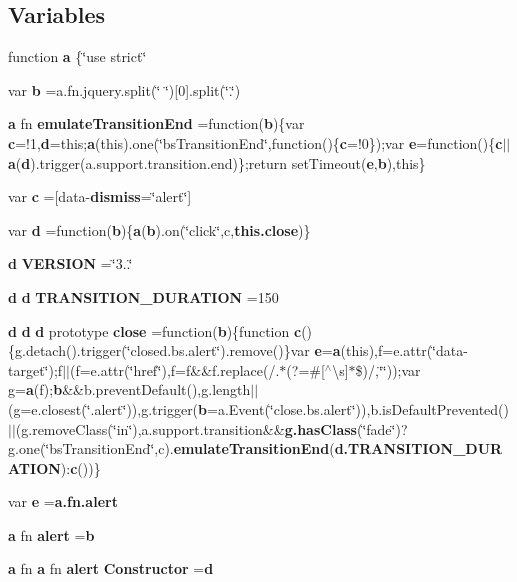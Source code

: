\subsection*{Variables}
\begin{DoxyCompactItemize}
\item 
function {\bf a} \{\char`\"{}use strict\char`\"{}
\item 
var {\bf b} =a.\+fn.\+jquery.\+split(\char`\"{} \char`\"{})[0].split(\char`\"{}.\char`\"{})
\item 
{\bf a} fn {\bf emulate\+Transition\+End} =function({\bf b})\{var {\bf c}=!1,{\bf d}=this;{\bf a}(this).one(\char`\"{}bs\+Transition\+End\char`\"{},function()\{{\bf c}=!0\});var {\bf e}=function()\{{\bf c}$\vert$$\vert${\bf a}({\bf d}).trigger(a.\+support.\+transition.\+end)\};return set\+Timeout({\bf e},{\bf b}),this\}
\item 
var {\bf c} =\textquotesingle{}[data-\/{\bf dismiss}=\char`\"{}alert\char`\"{}]\textquotesingle{}
\item 
var {\bf d} =function({\bf b})\{{\bf a}({\bf b}).on(\char`\"{}click\char`\"{},c,{\bf this.\+close})\}
\item 
{\bf d} {\bf V\+E\+R\+S\+I\+O\+N} =\char`\"{}3..\char`\"{}
\item 
{\bf d} {\bf d} {\bf T\+R\+A\+N\+S\+I\+T\+I\+O\+N\+\_\+\+D\+U\+R\+A\+T\+I\+O\+N} =150
\item 
{\bf d} {\bf d} {\bf d} prototype {\bf close} =function({\bf b})\{function {\bf c}()\{g.\+detach().trigger(\char`\"{}closed.\+bs.\+alert\char`\"{}).remove()\}var {\bf e}={\bf a}(this),f=e.\+attr(\char`\"{}data-\/target\char`\"{});f$\vert$$\vert$(f=e.\+attr(\char`\"{}href\char`\"{}),f=f\&\&f.\+replace(/.$\ast$(?=\#[$^\wedge$\textbackslash{}s]$\ast$\$)/,\char`\"{}\char`\"{}));var g={\bf a}(f);{\bf b}\&\&b.\+prevent\+Default(),g.\+length$\vert$$\vert$(g=e.\+closest(\char`\"{}.alert\char`\"{})),g.\+trigger({\bf b}=a.\+Event(\char`\"{}close.\+bs.\+alert\char`\"{})),b.\+is\+Default\+Prevented()$\vert$$\vert$(g.\+remove\+Class(\char`\"{}in\char`\"{}),a.\+support.\+transition\&\&{\bf g.\+has\+Class}(\char`\"{}fade\char`\"{})?g.\+one(\char`\"{}bs\+Transition\+End\char`\"{},c).{\bf emulate\+Transition\+End}({\bf d.\+T\+R\+A\+N\+S\+I\+T\+I\+O\+N\+\_\+\+D\+U\+R\+A\+T\+I\+O\+N})\+:{\bf c}())\}
\item 
var {\bf e} ={\bf a.\+fn.\+alert}
\item 
{\bf a} fn {\bf alert} ={\bf b}
\item 
{\bf a} fn {\bf a} fn {\bf alert} {\bf Constructor} ={\bf d}

\end{DoxyCompactItemize}
